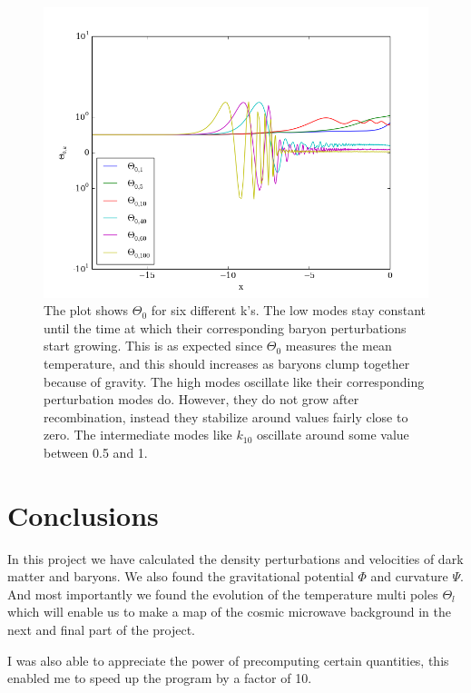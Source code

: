 \documentclass[a4paper]{report}
\begin{document}
\begin{figure}[ht]
\end{figure}

\begin{figure}[ht]
 \includegraphics[width=\textwidth]{Theta0.png}
 \caption{The plot shows $\Theta_0$ for six different k's. The low modes stay constant until the time at which their corresponding baryon perturbations start growing. This is as expected since $\Theta_0$ measures the mean temperature, and this should increases as baryons clump together because of gravity. The high modes oscillate like their corresponding perturbation modes do. However, they do not grow after recombination, instead they stabilize around values fairly close to zero. The intermediate modes like $k_{10}$ oscillate around some value between 0.5 and 1.}
 \label{fig:Theta0}
\end{figure}

\section{Conclusions} \label{sec:conclusions}
In this project we have calculated the density perturbations and velocities of dark matter and baryons. We also found the gravitational potential $\Phi$ and curvature $\Psi$. And most importantly we found the evolution of the temperature multi poles $\Theta_l$ which will enable us to make a map of the cosmic microwave background in the next and final part of the project.

I was also able to appreciate the power of precomputing certain quantities, this enabled me to speed up the program by a factor of 10.
\end{document}
